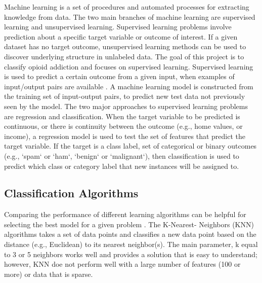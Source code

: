 \documentclass[sigconf]{acmart}
\begin{document}
Machine learning is a set of procedures and automated processes for extracting 
knowledge from data. The two main branches of machine learning are supervised 
learning and unsupervised learning. Supervised learning problems involve 
prediction about a specific target variable or outcome of interest. If a given 
dataset has no target outcome, unsupervised learning methods can be used to 
discover underlying structure in unlabeled data. The goal of this project is 
to classify opioid addiction and focuses on supervised learning. Supervised 
learning is used to predict a certain outcome from a given input, when examples 
of input/output pairs are available \cite{muller17}. A machine learning model 
is constructed from the training set of input-output pairs, to predict new test 
data not previously seen by the model. The two major approaches to supervised 
learning problems are regression and classification. When the target variable 
to be predicted is continuous, or there is continuity between the outcome 
(e.g., home values, or income), a regression model is used to test the set of 
features that predict the target variable. If the target is a class label, set 
of categorical or binary outcomes (e.g., `spam` or `ham`, `benign` or 
`malignant`), then classification is used to predict which class or category 
label that new instances will be assigned to.

\subsection{Classification Algorithms} 
Comparing the performance of different learning algorithms can be helpful for 
selecting the best model for a given problem \cite{raschka17}. The K-Nearest-
Neighbors (KNN) algorithms takes a set of data points and classifies a new data 
point based on the distance (e.g., Euclidean) to its nearest neighbor(s). 
The main parameter, k equal to 3 or 5 neighbors works well and provides a 
solution that is easy to understand; however, KNN doe not perform well with 
a large number of features (100 or more) or data that is sparse. 
\end{document}
